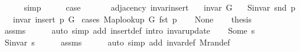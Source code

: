 \begin{isabellebody}
\ \ \ \ \isamarkupfalse%
\ simp\isanewline
\ \ \isamarkupfalse%
\ \isamarkupfalse%
\ {\isacharquery}{\kern0pt}case\isanewline
\ \ \ \ \isacommand{{\isachardot}{\kern0pt}}\isamarkupfalse%
\isanewline
{}\isamarkupfalse%
%
\endisatagproof
{\isafoldproof}%
%
\isadelimproof
\isanewline
%
\endisadelimproof
\isanewline
{}\isamarkupfalse%
\ {\isacharparenleft}{\kern0pt}\ adjacency{\isacharparenright}{\kern0pt}\ invar{\isacharunderscore}{\kern0pt}insert{\isacharunderscore}{\kern0pt}{}{\isacharcolon}{\kern0pt}\isanewline
\ \ \ {\isachardoublequoteopen}invar\ G{\isachardoublequoteclose}\isanewline
\ \ \ {\isachardoublequoteopen}S{\isachardot}{\kern0pt}invar\ {\isacharparenleft}{\kern0pt}snd\ p{\isacharparenright}{\kern0pt}{\isachardoublequoteclose}\isanewline
\ \ \ {\isachardoublequoteopen}invar\ {\isacharparenleft}{\kern0pt}insert{\isacharunderscore}{\kern0pt}{}\ p\ G{\isacharparenright}{\kern0pt}{\isachardoublequoteclose}\isanewline
%
\isadelimproof
%
\endisadelimproof
%
\isatagproof
{}\isamarkupfalse%
\ {\isacharparenleft}{\kern0pt}cases\ {\isachardoublequoteopen}Map{\isacharunderscore}{\kern0pt}lookup\ G\ {\isacharparenleft}{\kern0pt}fst\ p{\isacharparenright}{\kern0pt}{\isachardoublequoteclose}{\isacharparenright}{\kern0pt}\isanewline
\ \ \isamarkupfalse%
\ None\isanewline
\ \ \isamarkupfalse%
\ {\isacharquery}{\kern0pt}thesis\isanewline
\ \ \ \ \isamarkupfalse%
\ assms\isanewline
\ \ \ \ \isamarkupfalse%
\ {\isacharparenleft}{\kern0pt}auto\ simp\ add{\isacharcolon}{\kern0pt}\ insert{\isacharunderscore}{\kern0pt}{}{\isacharunderscore}{\kern0pt}def\ intro{\isacharcolon}{\kern0pt}\ invar{\isacharunderscore}{\kern0pt}update{\isacharparenright}{\kern0pt}\isanewline
{}\isamarkupfalse%
\isanewline
\ \ \isamarkupfalse%
\ {\isacharparenleft}{\kern0pt}Some\ s{\isacharparenright}{\kern0pt}\isanewline
\ \ \isamarkupfalse%
\ {\isachardoublequoteopen}S{\isachardot}{\kern0pt}invar\ s{\isachardoublequoteclose}\isanewline
\ \ \ \ \isamarkupfalse%
\ assms{\isacharparenleft}{\kern0pt}{}{\isacharparenright}{\kern0pt}\isanewline
\ \ \ \ \isamarkupfalse%
\ {\isacharparenleft}{\kern0pt}auto\ simp\ add{\isacharcolon}{\kern0pt}\ invar{\isacharunderscore}{\kern0pt}def\ M{\isachardot}{\kern0pt}ran{\isacharunderscore}{\kern0pt}def{\isacharparenright}{\kern0pt}\isanewline

\end{isabellebody}

